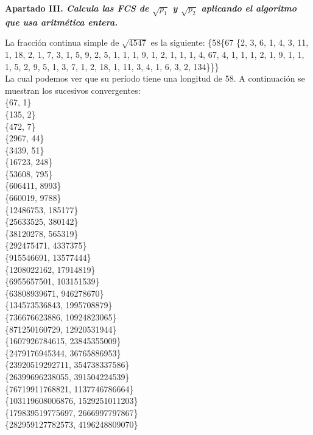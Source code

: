\documentclass[fleqn]{article}
\begin{document}
    \newpage
    \textbf{Apartado III. \textit{Calcula las FCS de $\sqrt{p_1}$ y $\sqrt{p_2}$ aplicando el algoritmo que usa aritmética entera.}}

    La fracción continua simple de $\sqrt{4547}$ es la siguiente:
    \{58\{67 \{2, 3, 6, 1, 4, 3, 11, 1, 18, 2, 1, 7, 3, 1, 5, 9, 2, 5, 1, 1, 1, 9, 1, 2, 1, 1, 1, 4, 67, 4, 1, 1, 1, 2, 1, 9, 1, 1, 1, 5, 
    2, 9, 5, 1, 3, 7, 1, 2, 18, 1, 11, 3, 4, 1, 6, 3, 2, 134\}\}\} \\
    La cual podemos ver que su período tiene una longitud de 58. A continuación se muestran los sucesivos convergentes: \\
    \{67, 1\} \\
    \{135, 2\} \\ 
    \{472, 7\} \\ 
    \{2967, 44\} \\ 
    \{3439, 51\} \\ 
    \{16723, 248\} \\ 
    \{53608, 795\} \\ 
    \{606411, 8993\} \\
    \{660019, 9788\} \\ 
    \{12486753, 185177\} \\
    \{25633525, 380142\} \\
    \{38120278, 565319\} \\
    \{292475471, 4337375\} \\
    \{915546691, 13577444\} \\
    \{1208022162, 17914819\} \\
    \{6955657501, 103151539\} \\
    \{63808939671, 946278670\} \\
    \{134573536843, 1995708879\} \\
    \{736676623886, 10924823065\} \\
    \{871250160729, 12920531944\} \\
    \{1607926784615, 23845355009\} \\
    \{2479176945344, 36765886953\} \\
    \{23920519292711, 354738337586\} \\
    \{26399696238055, 391504224539\} \\
    \{76719911768821, 1137746786664\} \\
    \{103119608006876, 1529251011203\} \\
    \{179839519775697, 2666997797867\} \\
    \{282959127782573, 4196248809070\} \\
\end{document}
